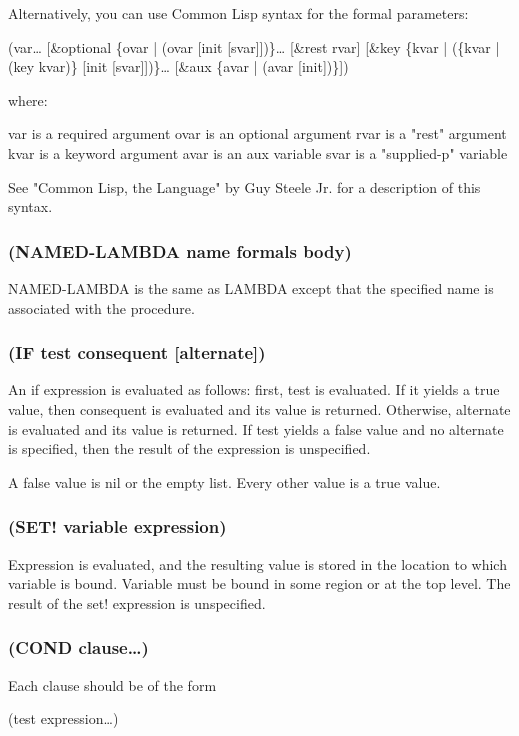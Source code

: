 \documentclass[11pt]{article}
\begin{document}
Alternatively, you can use Common Lisp syntax for the formal parameters:

(var\ldots{}
[\&optional \{ovar | (ovar [init [svar]])\}\ldots{}
[\&rest rvar]
[\&key \{kvar | (\{kvar | (key kvar)\} [init [svar]])\}\ldots{}
[\&aux \{avar | (avar [init])\}])

where:

var is a required argument
ovar is an optional argument
rvar is a "rest" argument
kvar is a keyword argument
avar is an aux variable
svar is a "supplied-p" variable

See "Common Lisp, the Language" by Guy Steele Jr. for a description
of this syntax.
\subsubsection{(NAMED-LAMBDA name formals body)}
\label{sec-4-3-8}

NAMED-LAMBDA is the same as LAMBDA except that the specified name is
associated with the procedure.
\subsubsection{(IF test consequent [alternate])}
\label{sec-4-3-9}

An if expression is evaluated as follows: first, test is evaluated.
If it yields a true value, then consequent is evaluated and its value
is returned.  Otherwise, alternate is evaluated and its value is
returned.  If test yields a false value and no alternate is
specified, then the result of the expression is unspecified.

A false value is nil or the empty list.  Every other value is a true
value.
\subsubsection{(SET! variable expression)}
\label{sec-4-3-10}

Expression is evaluated, and the resulting value is stored in the
location to which variable is bound.  Variable must be bound in some
region or at the top level.  The result of the set! expression is
unspecified.
\subsubsection{(COND clause\ldots{})}
\label{sec-4-3-11}

Each clause should be of the form

(test expression\ldots{})
\end{document}
